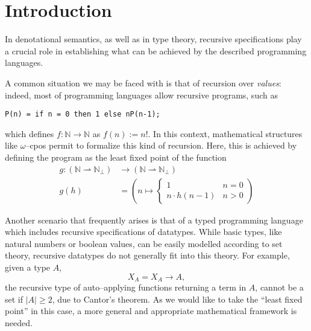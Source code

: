 \section{Introduction}

\nocite{Winskel1993}
\nocite{Hemerik1988}

In denotational semantics, as well as in type theory, recursive specifications play a crucial role in establishing what can be achieved by the described programming languages.

%
A common situation we may be faced with is that of recursion over \emph{values}: indeed, most of programming languages allow recursive programs, such as
\begin{displayquote}
  \texttt{P(n) = if n = 0 then 1 else nP(n-1);}
\end{displayquote}
which defines \(f \colon \mathbb{N} \to \mathbb{N}\) as \(f(n) := n!\).
In this context, mathematical structures like \(\omega\)--cpos permit to formalize this kind of recursion.
Here, this is achieved by defining the program as the least fixed point of the function
\begin{equation*}
  \begin{split}
    g \colon (\mathbb{N} \rightharpoonup \mathbb{N}_\bot) &\to (\mathbb{N} \rightharpoonup \mathbb{N}_\bot) \\
    g(h) &= \left(n \mapsto \begin{cases}1 & n = 0 \\ n\cdot h(n-1) & n > 0\end{cases}\right)
  \end{split}
\end{equation*}

Another scenario that frequently arises is that of a typed programming language which includes recursive specifications of datatypes.
While basic types, like natural numbers or boolean values, can be easily modelled according to set theory, recursive datatypes do not generally fit into this theory.
For example, given a type \(A\),
\begin{equation*}
  X_A = X_A \to A,
\end{equation*}
the recursive type of auto--applying functions returning a term in \(A\), cannot be a set if \(\lvert A \rvert \ge 2\), due to Cantor's theorem.
As we would like to take the ``least fixed point'' in this case, a more general and appropriate mathematical framework is needed.

